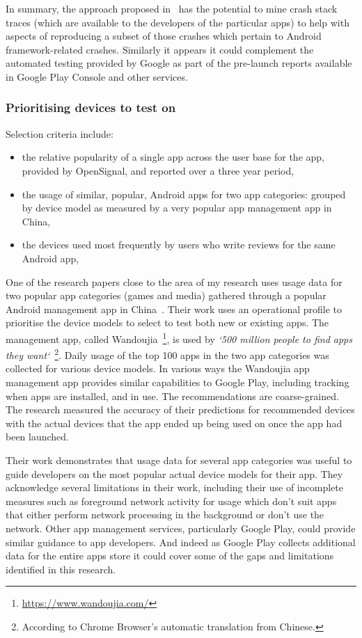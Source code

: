 In summary, the approach proposed in~\citep{kong2019_mining_android_crash_fixes} has the potential to mine crash stack traces (which are available to the developers of the particular apps) to help with aspects of reproducing a subset of those crashes which pertain to Android framework-related crashes. Similarly it appears it could complement the automated testing provided by Google as part of the pre-launch reports available in Google Play Console and other services. 

\subsubsection{Prioritising devices to test on}

Selection criteria include:
\begin{itemize}
    \item the relative popularity of a single app across the user base for the app, provided by OpenSignal, and reported over a three year period,
    \item the usage of similar, popular, Android apps for two app categories: grouped by device model as measured by a very popular app management app in China,
    \item the devices used most frequently by users who write reviews for the same Android app,
\end{itemize}

One of the research papers close to the area of my research uses usage data for two popular app categories (games and media) gathered through a popular Android management app in China~\citep{lu2016_PRADA}. Their work uses an operational profile to prioritise the device models to select to test both new or existing apps. The management app, called Wandoujia~\footnote{\url{https://www.wandoujia.com/}}, is used by \emph{`500 million people to find apps they want`}~\footnote{According to Chrome Browser's automatic translation from Chinese.}. Daily usage of the top 100 apps in the two app categories was collected for various device models. In various ways the Wandoujia app management app provides similar capabilities to Google Play, including tracking when apps are installed, and in use. The recommendations are coarse-grained. The research measured the accuracy of their predictions for recommended devices with the actual devices that the app ended up being used on once the app had been launched. 

Their work demonstrates that usage data for several app categories was useful to guide developers on the most popular actual device models for their app. They acknowledge several limitations in their work, including their use of incomplete measures such as foreground network activity for usage which don't suit apps that either perform network processing in the background or don't use the network. Other app management services, particularly Google Play, could provide similar guidance to app developers. And indeed as Google Play collects additional data for the entire apps store it could cover some of the gaps and limitations identified in this research.


